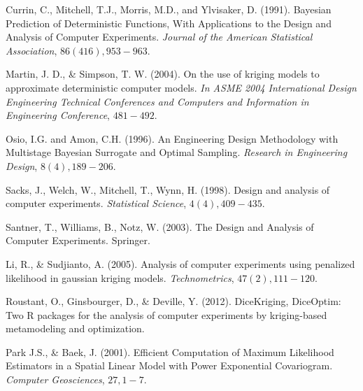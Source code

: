 
\begin{thebibliography}{94}

 Currin, C., Mitchell, T.J., Morris, M.D., and Ylvisaker, D. (1991). Bayesian Prediction of Deterministic Functions, With Applications to the Design and Analysis of Computer Experiments. {\it Journal of the American Statistical Association}, $86(416), 953-963$. 

 Martin, J. D., \& Simpson, T. W. (2004). On the use of kriging models to approximate deterministic computer models. {\it In ASME 2004 International Design Engineering Technical Conferences and Computers and Information in Engineering Conference}, $481-492$.

 Osio, I.G. and Amon, C.H. (1996). An Engineering Design Methodology with Multistage Bayesian Surrogate and Optimal Sampling. {\it Research in Engineering Design}, $8(4), 189-206$.

 Sacks, J., Welch, W., Mitchell, T., Wynn, H. (1998). Design and analysis of computer experiments. {\it Statistical Science}, $4(4), 409-435$.

 Santner, T., Williams, B., Notz, W. (2003). The Design and Analysis of Computer Experiments. Springer.

 Li, R., \& Sudjianto, A. (2005). Analysis of computer experiments using penalized likelihood in gaussian kriging models. {\it Technometrics}, $47(2), 111-120$.


 Roustant, O., Ginsbourger, D., \& Deville, Y. (2012). DiceKriging, DiceOptim: Two R packages for the analysis of computer experiments by kriging-based metamodeling and optimization.

 Park J.S., \& Baek, J. (2001). Efficient Computation of Maximum Likelihood Estimators in a
Spatial Linear Model with Power Exponential Covariogram. {\it Computer Geosciences}, $27, 1-7$.



\end{thebibliography}
